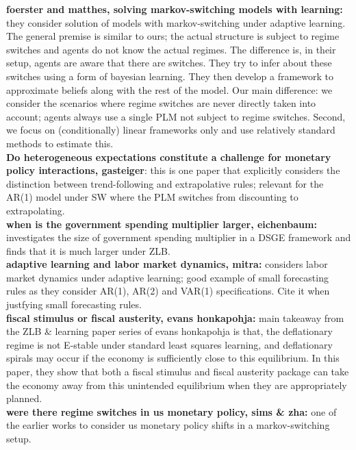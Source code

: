 \documentclass[12pt,reqno]{article}
\numberwithin{equation}{section}
\begin{document}
\textbf{foerster and matthes, solving markov-switching models with learning:}\\
they consider solution of models with markov-switching under adaptive learning. The general premise is similar to ours; the actual structure is subject to regime switches and agents do not know the actual regimes. The difference is, in their setup, agents are aware that there are switches. They try to infer about these switches using a form of bayesian learning. They then develop a framework to approximate beliefs along with the rest of the model. Our main difference: we consider the scenarios where regime switches are never directly taken into account; agents always use a single PLM not subject to regime switches. Second, we focus on (conditionally) linear frameworks only and use relatively standard methods to estimate this. \\

\textbf{Do heterogeneous expectations constitute a challenge for monetary policy interactions, gasteiger}: this is one paper that explicitly considers the distinction between trend-following and extrapolative rules; relevant for the AR(1) model under SW where the PLM switches from discounting to extrapolating. \\

\textbf{when is the government spending multiplier larger, eichenbaum:} investigates the size of government spending multiplier in a DSGE framework and finds that it is much larger under ZLB. \\

\textbf{adaptive learning and labor market dynamics, mitra:} considers labor market dynamics under adaptive learning; good example of small forecasting rules as they consider AR(1), AR(2) and VAR(1) specifications. Cite it when justfying small forecasting rules. \\

\textbf{fiscal stimulus or fiscal austerity, evans honkapohja: } main takeaway from the ZLB \& learning paper series of evans honkapohja is that, the deflationary regime is not E-stable under standard least squares learning, and deflationary spirals may occur if the economy is sufficiently close to this equilibrium. In this paper, they show that both a fiscal stimulus and fiscal austerity package can take the economy away from this unintended equilibrium when they are appropriately planned. \\

\textbf{ were there regime switches in us monetary policy, sims \& zha:} one of the earlier works to consider us monetary policy shifts in a markov-switching setup. \\
\end{document}
